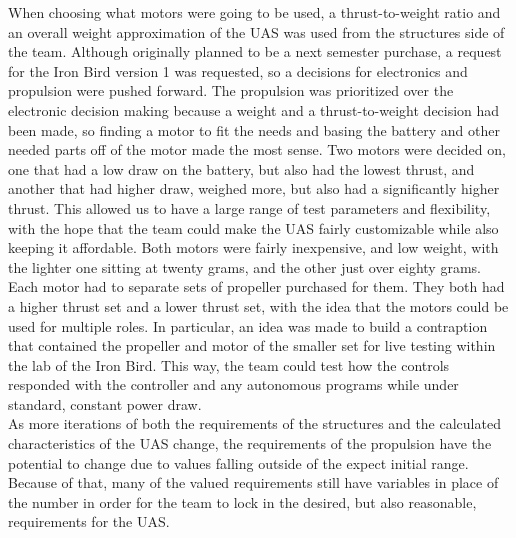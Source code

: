 ﻿\documentclass{article}
\begin{document}
\noindent When choosing what motors were going to be used, a thrust-to-weight ratio and an overall weight approximation of the UAS was used from the structures side of the team. Although originally planned to be a next semester purchase, a request for the Iron Bird version 1 was requested, so a decisions for electronics and propulsion were pushed forward. The propulsion was prioritized over the electronic decision making because a weight and a thrust-to-weight decision had been made, so finding a motor to fit the needs and basing the battery and other needed parts off of the motor made the most sense. Two motors were decided on, one that had a low draw on the battery, but also had the lowest thrust, and another that had higher draw, weighed more, but also had a significantly higher thrust. This allowed us to have a large range of test parameters and flexibility, with the hope that the team could make the UAS fairly customizable while also keeping it affordable. Both motors were fairly inexpensive, and low weight, with the lighter one sitting at twenty grams, and the other just over eighty grams. \\

\noindent Each motor had to separate sets of propeller purchased for them. They both had a higher thrust set and a lower thrust set, with the idea that the motors could be used for multiple roles. In particular, an idea was made to build a contraption that contained the propeller and motor of the smaller set for live testing within the lab of the Iron Bird. This way, the team could test how the controls responded with the controller and any autonomous programs while under standard, constant power draw. \\

\noindent As more iterations of both the requirements of the structures and the calculated characteristics of the UAS change, the requirements of the propulsion have the potential to change due to values falling outside of the expect initial range. Because of that, many of the valued requirements still have variables in place of the number in order for the team to lock in the desired, but also reasonable, requirements for the UAS. \\
\end{document}
